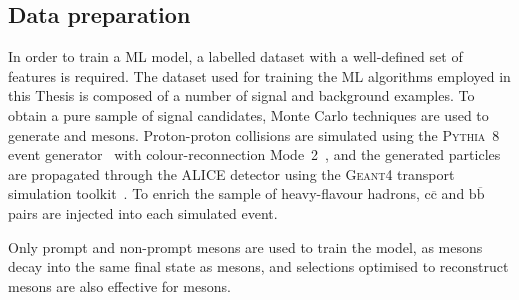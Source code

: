\subsection{Data preparation}\label{sec:ml_data_preparation}
In order to train a ML model, a labelled dataset with a well-defined set of features is required. The dataset used for training the ML algorithms employed in this Thesis is composed of a number of signal and background examples. To obtain a pure sample of signal candidates, Monte Carlo techniques are used to generate \ds and \dpl mesons. Proton-proton collisions are simulated using the \textsc{Pythia~8} event generator~\cite{Bierlich:2022pfr} with colour-reconnection Mode~2~\cite{Christiansen:2015yqa}, and the generated particles are propagated through the ALICE detector using the \textsc{Geant4} transport simulation toolkit~\cite{GEANT4:2002zbu}. To enrich the sample of heavy-flavour hadrons, $\mathrm{c\overline{c}}$ and $\mathrm{b\overline{b}}$ pairs are injected into each simulated event. 



Only prompt and non-prompt \ds mesons are used to train the model, as \dpl mesons decay into the same final state as \ds mesons, and selections optimised to reconstruct \ds mesons are also effective for \dpl mesons. 

